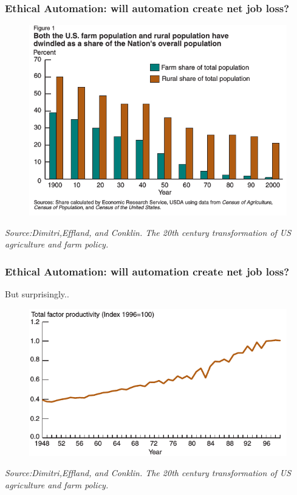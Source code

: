 \begin{frame}
  \frametitle{Ethical Automation: will automation create net job loss?}
  
  \begin{figure}[bht]
    \centering
    \includegraphics[scale=0.5]{diagrams/agriculture-data}
  \end{figure}
  \textit{Source:Dimitri,Effland, and Conklin. The 20th century transformation of US agriculture and farm policy.}
  
\end{frame}

\begin{frame}
  \frametitle{Ethical Automation: will automation create net job loss? }
  {\Large But surprisingly..}
  \begin{figure}[bht]
    \centering
    \includegraphics[scale= 0.4]{diagrams/agriculture-production}
  \end{figure}
  \textit{Source:Dimitri,Effland, and Conklin. The 20th century transformation of US agriculture and farm policy.}
\end{frame}

